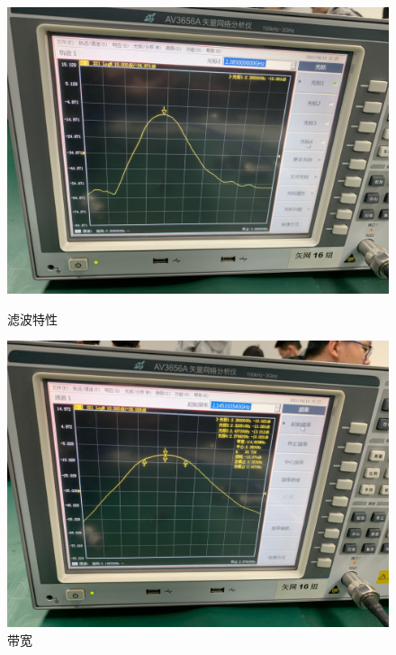 \documentclass{../source/Experiment}
\begin{document}
\begin{figure}[H]
    \centering
    \begin{minipage}[t]{0.48\textwidth}
        \centering
        \includegraphics[width=1\textwidth]{pic/滤波特性}
        \caption{滤波特性}
    \end{minipage}
    \begin{minipage}[t]{0.48\textwidth}
        \centering
        \includegraphics[width=1\textwidth]{pic/带宽}
        \caption{带宽}
    \end{minipage}
\end{figure}
\end{document}
